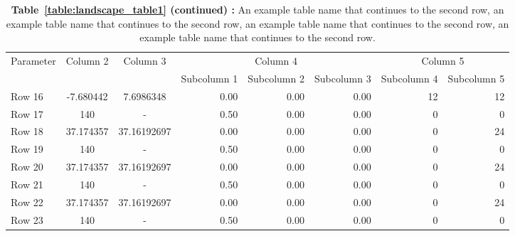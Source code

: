 

\begin{landscape}
\thispagestyle{empty}
\begin{table}[!htb]
\vspace{6mm}
{\setlength{\tabcolsep}{14pt}
\renewcommand{\arraystretch}{1.1} %
\caption*{{\bf Table~\ref{table:landscape_table1} (continued) :} An example table name that continues to the second row, an example table name that continues to the second row, an example table name that continues to the second row, an example table name that continues to the second row.}
\begin{center}
\vspace{-6mm}
\begin{tabular}{|l|c|c|r|r|r|r|r|}
\hline
\multirow{2}{*}{Parameter} & \multirow{2}{*}{Column 2} & \multirow{2}{*}{Column 3} & \multicolumn{3}{|c|}{Column 4} & \multicolumn{2}{|c|}{Column 5}\\ \cline{4-8}
  & & & Subcolumn 1 & Subcolumn 2 & Subcolumn 3 & Subcolumn 4 & Subcolumn 5 \\
\hline
Row 16 & -7.680442 & 7.6986348 & 0.00 & 0.00 & 0.00 & 12 & 12 \\
Row 17 & 140 & - & 0.50 & 0.00 & 0.00 & 0 & 0 \\
Row 18 & 37.174357 & 37.16192697 & 0.00 & 0.00 & 0.00 & 0 & 24 \\
Row 19 & 140 & - & 0.50 & 0.00 & 0.00 & 0 & 0 \\
Row 20 & 37.174357 & 37.16192697 & 0.00 & 0.00 & 0.00 & 0 & 24 \\
Row 21 & 140 & - & 0.50 & 0.00 & 0.00 & 0 & 0 \\
Row 22 & 37.174357 & 37.16192697 & 0.00 & 0.00 & 0.00 & 0 & 24 \\
Row 23 & 140 & - & 0.50 & 0.00 & 0.00 & 0 & 0 \\
\hline
\end{tabular}
\end{center}
\begin{center}
      \vspace{70mm}    %
      \hspace{0cm}\pageref{table:landscape_table1_cont}
      \label{table:landscape_table1_cont}
\end{center}
}
\end{table}
\end{landscape}
